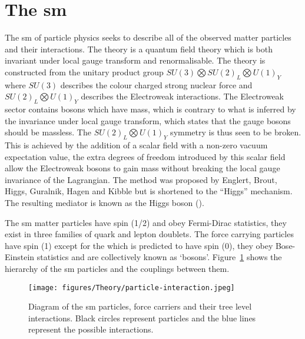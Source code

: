 \section{The \ac{sm}} %
\label{sec:the_standard_model_sm_}

The \ac{sm} of particle physics 
 seeks to describe all 
of the observed matter particles and their interactions. The theory is a 
quantum field theory which is both invariant under local gauge transform and 
renormalisable. The theory is constructed from the unitary product group
$SU(3)\bigotimes SU(2)_{L} \bigotimes U(1)_{Y}$ where $SU(3)$ describes the
colour charged strong nuclear force and $SU(2)_{L} \bigotimes U(1)_{Y}$
describes the Electroweak interactions. The Electroweak sector contains 
bosons which have mass, which is contrary to what is inferred by the
invariance under local gauge transform, which states that the gauge bosons 
should be massless. The $SU(2)_{L} \bigotimes U(1)_{Y}$ symmetry is thus seen 
to be broken. This is achieved by the addition of a scalar field with a 
non-zero vacuum expectation value, the extra degrees of freedom introduced by 
this scalar field allow the Electroweak bosons to gain mass without breaking 
the local gauge invariance of the Lagrangian. The method was proposed by 
Englert, Brout, Higgs, Guralnik, Hagen and Kibble 
 but 
is shortened to the ``Higgs'' mechanism. The resulting mediator is known as
the Higgs boson (\PHiggs).

The \ac{sm} matter particles have spin (1/2) and obey Fermi-Dirac statistics,
they exist in three families of quark and lepton doublets. The force carrying
particles have spin (1) except for the \PHiggs which is predicted to have spin
(0), they obey Bose-Einstein statistics and are collectively known as `bosons'.
Figure~\ref{fig:figures_Theory_particle-interaction} shows the hierarchy of the
\ac{sm} particles and the couplings between them.

\begin{figure}[htbp]
  \centering
    \texttt{[image: figures/Theory/particle-interaction.jpeg]}
  \caption{Diagram of the \ac{sm} particles, force carriers and their tree 
  level interactions. Black circles represent particles and the blue lines 
  represent the possible interactions.}
  \label{fig:figures_Theory_particle-interaction}
\end{figure}

